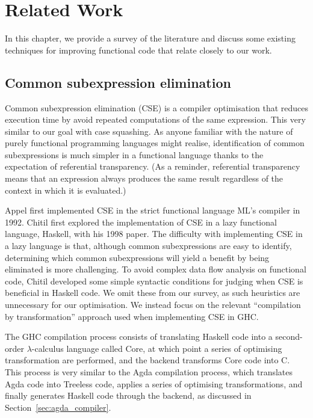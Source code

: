 \chapter{Related Work}
\label{cha:related_work}

In this chapter, we provide a survey of the literature and discuss some existing techniques for improving functional code that relate closely to our work.

\section{Common subexpression elimination}

Common subexpression elimination (CSE) is a compiler optimisation that reduces execution time by avoid repeated computations of the same expression.\citep{Chitil-1998} This very similar to our goal with case squashing. As anyone familiar with the nature of purely functional programming languages might realise, identification of common subexpressions is much simpler in a functional language thanks to the expectation of referential transparency.\citep{Chitil-1998} (As a reminder, referential transparency means that an expression always produces the same result regardless of the context in which it is evaluated.)

Appel first implemented CSE in the strict functional language ML's compiler in 1992.\citep{appel1992} Chitil first explored the implementation of CSE in a lazy functional language, Haskell, with his 1998 paper.\citep{Chitil-1998} The difficulty with implementing CSE in a lazy language is that, although common subexpressions are easy to identify, determining which common subexpressions will yield a benefit by being eliminated is more challenging. To avoid complex data flow analysis on functional code, Chitil developed some simple syntactic conditions for judging when CSE is beneficial in Haskell code.\citep{Chitil-1998} We omit these from our survey, as such heuristics are unnecessary for our optimisation. We instead focus on the relevant ``compilation by transformation'' approach used when implementing CSE in GHC.

The GHC compilation process consists of translating Haskell code into a second-order $\lambda$-calculus language called Core, at which point a series of optimising transformation are performed, and the backend transforms Core code into C.\citep{Chitil-1998} This process is very similar to the Agda compilation process, which translates Agda code into Treeless code, applies a series of optimising transformations, and finally generates Haskell code through the backend, as discussed in Section~\ref{sec:agda_compiler}.

